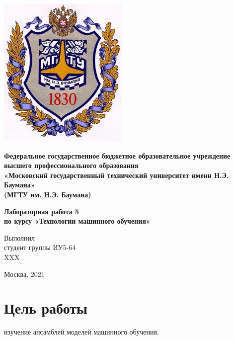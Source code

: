 \documentclass[a4paper]{article}
\begin{document}
  \fontsize{14}{16}\selectfont

  \begin{titlepage}
    \begin{minipage}{0.2\textwidth}
      \includegraphics[scale=0.4]{logo}
    \end{minipage}
    \begin{minipage}{0.7\textwidth}\centering
      \fontsize{10}{12}\selectfont
      \textbf{
        Федеральное государственное бюджетное образовательное учреждение \\
        высшего профессионального образования \\
        «Московский государственный технический университет имени Н.Э. Баумана» \\
        (МГТУ им. Н.Э. Баумана)
      }
    \end{minipage}

    \vspace{5cm}
    \centering
    \textbf{
      Лабораторная работа 5 \\
      по курсу «Технологии машинного обучения» \\
    }

    \vspace{5cm}
    \begin{flushright}
    Выполнил \\
    студент группы ИУ5-64 \\
    XXX
    \end{flushright}
    \vspace*{\fill}
    Москва, 2021
  \end{titlepage}

  \section*{Цель работы}
  изучение ансамблей моделей машинного обучения.
\end{document}
